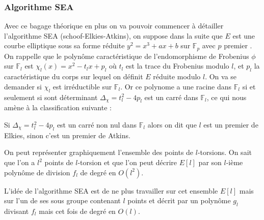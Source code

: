 \documentclass[12pt]{article}
\begin{document}
\subsubsection{Algorithme SEA}
Avec ce bagage théorique en plus on va pouvoir commencer à détailler l'algorithme SEA (schoof-Elkies-Atkins), on suppose dans la suite que $E$ est une courbe elliptique sous sa forme réduite $y^2 = x^3 + ax +b$ sur $\mathbb{F}_p$ avec $p$ premier . On rappelle que le polynôme caractéristique de l’endomorphisme de Frobenius $\phi$ sur $\mathbb{F}_l$ est $\chi_l(x) = x^2 - t_lx +p_l$ où $t_l$ est la trace du Frobenius modulo $l$, et $p_l$ la caractéristique du corps sur lequel on définit $E$ réduite modulo $l$. On va se demander si $\chi_l$ est irréductible sur $\mathbb{F}_l$. Or ce polynome a une racine dans $\mathbb{F}_l$ si et seulement si sont déterminant $\Delta_{\chi} = t_l^2 - 4p_l$ est un carré dans $\mathbb{F}_l$, ce qui nous amène à la classification suivante :

\begin{defi}
\label{Atkins's prime}
Si $\Delta_{\chi} = t_l^2 - 4p_l$ est un carré non nul dans $\mathbb{F}_l$ alors on dit que $l$ est un premier de Elkies, sinon c'est un premier de Atkins.
\end{defi}
\bigskip
On peut représenter graphiquement l'ensemble des points de $l$-torsions. On sait que l'on a $l^2$ points de $l$-torsion et que l'on peut décrire $E[l]$ par son $l$-ième polynôme de division $f_l$ de degré en $O(l^2)$.


L'idée de l'algorithme SEA est de ne plus travailler sur cet ensemble $E[l]$ mais sur l'un de ses sous groupe contenant $l$ points et décrit par un polynôme $g_l$ divisant $f_l$ mais cet fois de degré en $O(l)$.
\newline
\bigskip
{}
\end{document}

